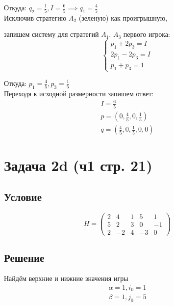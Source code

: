 \documentclass[a4paper,14pt]{extreport}
\begin{document}
Откуда: $q_2 = \frac{1}{5}, I=\frac{6}{5} \implies q_1 = \frac{4}{5}$\\

Исключив стратегию $A_2$ (зеленую) как проигрышную, \par
запишем систему для стратегий $A_1$, $A_3$ первого игрока:
\begin{equation}
\begin{cases}
    p_1 + 2p_3 = I \\
    2p_1 - 2p_3 = I \\
    p_1 + p_3 = 1
\end{cases}
\end{equation}

Откуда: $p_1 = \frac{4}{5}, p_3 = \frac{1}{5}$\\

Переходя к исходной размерности запишем ответ:
\begin{equation*}
\begin{multlined}
    I = \frac{6}{5}\\
    p = (0, \frac{4}{5}, 0, \frac{1}{5})\\
    q = (\frac{4}{5}, 0, \frac{1}{5}, 0, 0)
\end{multlined}
\end{equation*}


\section{Задача 2d (ч1 стр. 21)}
\subsection{Условие}
\begin{equation}
    H = \begin{pmatrix} 
            2 & 4 & 1 & 5 & 1 \\ 
            5 & 2 & 3 & 0 & -1 \\
            2 & -2 & 4 & -3 & 0
        \end{pmatrix}
\end{equation}

\subsection{Решение}
Найдём верхние и нижние значения игры
\begin{equation*}
\begin{multlined}
    \alpha = 1, i_0 = 1\\
    \beta = 1, j_0 = 5
\end{multlined}
\end{equation*}
\end{document}
